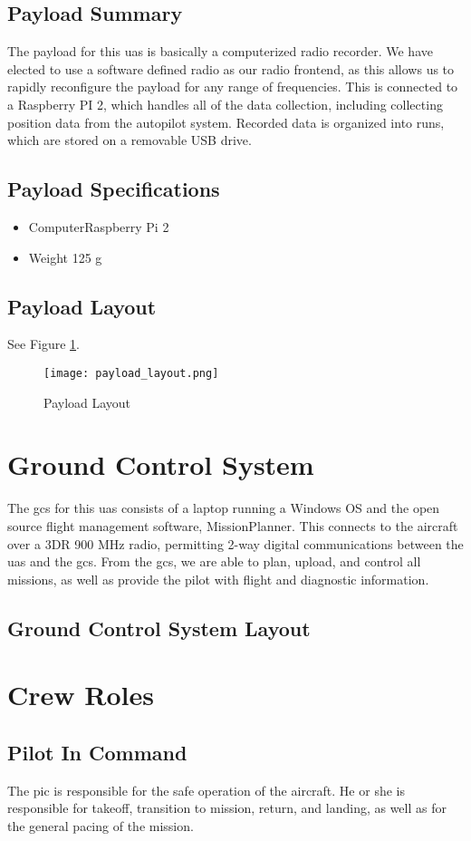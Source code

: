 \documentclass{report}
\begin{document}
		\subsection{Payload Summary}
			The payload for this \gls{uas} is basically a computerized radio recorder.  We have elected to use a software defined radio as our radio frontend, as this allows us to rapidly reconfigure the payload for any range of frequencies.  This is connected to a Raspberry PI 2, which handles all of the data collection, including collecting position data from the autopilot system.  Recorded data is organized into runs, which are stored on a removable USB drive.
		\subsection{Payload Specifications}
			\begin{itemize}
				\item Computer\hfill Raspberry Pi 2
				\item Weight \hfill 125 g
			\end{itemize}
		\subsection{Payload Layout}
			See Figure \ref{fig:payload_layout}.
			\begin{figure}[ht]
				\centering
				\caption{Payload Layout}
				\texttt{[image: payload\_layout.png]}
				\label{fig:payload_layout}
			\end{figure}
	\section{Ground Control System}
		The \gls{gcs} for this \gls{uas} consists of a laptop running a Windows OS and the open source flight management software, MissionPlanner.  This connects to the aircraft over a 3DR 900 MHz radio, permitting 2-way digital communications between the \gls{uas} and the \gls{gcs}.  From the \gls{gcs}, we are able to plan, upload, and control all missions, as well as provide the pilot with flight and diagnostic information.
		\subsection{Ground Control System Layout}
	\section{Crew Roles}
		\subsection{Pilot In Command}
			The \gls{pic} is responsible for the safe operation of the aircraft.  He or she is responsible for takeoff, transition to mission, return, and landing, as well as for the general pacing of the mission.
\end{document}
